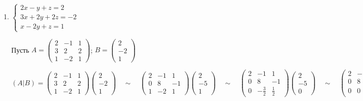 \begin{enumerate}
    \item $\begin{cases}
              2x - y + z = 2 \\
              3x + 2y + 2z = -2 \\
              x - 2y + z = 1
    \end{cases}$

    Пусть $A = \begin{pmatrix}2 & -1 & 1\\ 3 & 2 & 2 \\ 1 & -2 & 1\end{pmatrix}$; $B = \begin{pmatrix}2 \\ -2 \\ 1\end{pmatrix}$

    $(A|B) = \begin{pmatrix}2 & -1 & 1\\ 3 & 2 & 2 \\ 1 & -2 & 1\end{pmatrix}\begin{pmatrix}2 \\ -2 \\ 1\end{pmatrix}
    \quad\sim\quad
    \begin{pmatrix}2 & -1 & 1\\ 0 & 8 & -1 \\ 1 & -2 & 1\end{pmatrix}\begin{pmatrix}2 \\ -5 \\ 1\end{pmatrix}
    \quad\sim\quad
    \begin{pmatrix}2 & -1 & 1\\ 0 & 8 & -1 \\ 0 & -\frac{3}{2} & \frac{1}{2}\end{pmatrix}\begin{pmatrix}2 \\ -5 \\ 0\end{pmatrix}
    \quad\sim\quad
    \begin{pmatrix}2 & -1 & 1\\ 0 & 8 & -1 \\ 0 & 0 & \frac{5}{16}\end{pmatrix}\begin{pmatrix}2 \\ -5 \\ -\frac{15}{16}\end{pmatrix}$


\end{enumerate}

